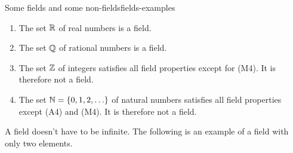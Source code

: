 \begin{example}{Some fields and some non-fields}{fields-examples}
  \begin{enumialphparenastyle}
    \begin{enumerate}
    \item The set $\mathbb{R}$ of real numbers is a field.
    \item The set $\mathbb{Q}$ of rational numbers is a field.
    \item The set $\mathbb{Z}$ of integers satisfies all field
      properties except for (M4). It is therefore not a field.
    \item The set $\mathbb{N}=\left\{0,1,2,\ldots\right\}$ of natural numbers
      satisfies all field properties except (A4) and (M4). It is
      therefore not a field.
    \end{enumerate}
  \end{enumialphparenastyle}
\end{example}

A field doesn't have to be infinite. The following is an example of a
field with only two elements.

